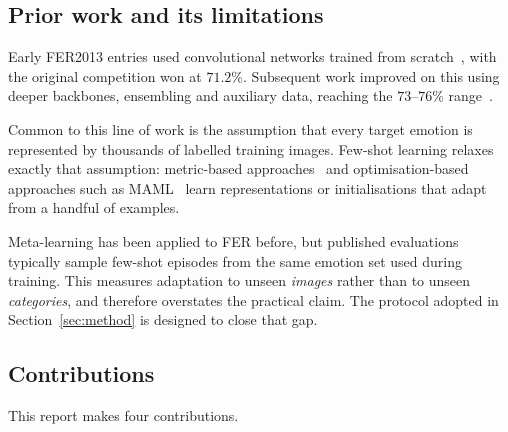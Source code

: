 \documentclass[11pt,a4paper]{article}
\begin{document}
\subsection{Prior work and its limitations}
Early FER2013 entries used convolutional networks trained from
scratch~\cite{tang2013deep}, with the original competition won at $71.2\%$.
Subsequent work improved on this using deeper backbones, ensembling and
auxiliary data, reaching the $73$--$76\%$
range~\cite{khaireddin2021facial,pramerdorfer2016facial}.

Common to this line of work is the assumption that every target emotion is
represented by thousands of labelled training images. Few-shot learning relaxes
exactly that assumption: metric-based
approaches~\cite{snell2017prototypical,vinyals2016matching} and
optimisation-based approaches such as MAML~\cite{finn2017model} learn
representations or initialisations that adapt from a handful of examples.

Meta-learning has been applied to FER before, but published evaluations
typically sample few-shot episodes from the same emotion set used during
training. This measures adaptation to unseen \emph{images} rather than to
unseen \emph{categories}, and therefore overstates the practical claim. The
protocol adopted in Section~\ref{sec:method} is designed to close that gap.

\subsection{Contributions}
This report makes four contributions.
\end{document}

